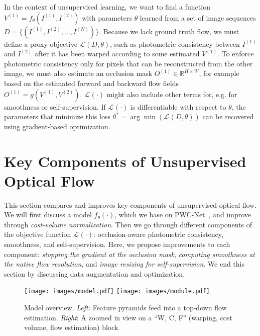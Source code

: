 \documentclass[runningheads]{llncs}
\newcommand{\lossfun}[1]{\mathcal{L}_\mathit{#1}}
\begin{document}
In the context of unsupervised learning, we want to find a function $V^{(1)}=f_\theta(I^{(1)}, I^{(2)})$ with parameters $\theta$ learned from a set of image sequences $D=\{ (I^{(1)}, I^{(2)}, \dots, I^{(N)})\}$. Because we lack ground truth flow, we must define a proxy objective $\lossfun{}(D, \theta)$, such as photometric consistency between $I^{(1)}$ and $I^{(2)}$ after it has been warped according to some estimated $V^{(1)}$. To enforce photometric consistency only for pixels that can be reconstructed from the other image, we must also estimate an occlusion mask $O^{(1)} \in \mathbb{R}^{H \times W}$, for example based on the estimated forward and backward flow fields $O^{(1)}=g(V^{(1)}, V^{(2)})$. $\lossfun{}(\cdot)$ might also include other terms for, e.g. for smoothness or self-supervision. If $\lossfun{}(\cdot)$ is differentiable with respect to $\theta$, the parameters that minimize this loss $\theta^*=\arg\min(\lossfun{}(D, \theta))$ can be recovered using gradient-based optimization.

\section{Key Components of Unsupervised Optical Flow}

This section compares and improves key components of unsupervised optical flow. We will first discuss a model $f_\theta(\cdot)$, which we base on PWC-Net~\cite{Sun2018PWCNet}, and improve through \emph{cost-volume normalization}. Then we go through different components of the objective function $\lossfun{}(\cdot)$: occlusion-aware photometric consistency, smoothness, and self-supervision. Here, we propose improvements to each component: \emph{stopping the gradient at the occlusion mask}, \emph{computing smoothness at the native flow resolution}, and \emph{image resizing for self-supervision}. We end this section by discussing data augmentation and optimization.


\begin{figure}[t]
    \centering
    \texttt{[image: images/model.pdf]}\hspace{0.1cm}
    \texttt{[image: images/module.pdf]}\caption{Model overview. \emph{Left:} Feature pyramids feed into a top-down flow estimation. \emph{Right}: A zoomed in view on a ``W, C, F'' (warping, cost volume, flow estimation) block}
    \label{fig:model}
\end{figure}
\end{document}
